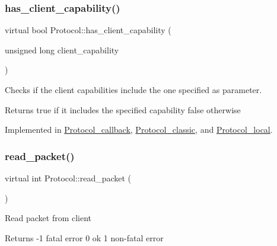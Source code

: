 \mbox{\label{classProtocol_aea1d05eaf76707b3772a00a43ea0e49b}} 
\subsubsection{\texorpdfstring{has\+\_\+client\+\_\+capability()}{has\_client\_capability()}}
{\footnotesize\ttfamily virtual bool Protocol\+::has\+\_\+client\+\_\+capability (\begin{DoxyParamCaption}\item[{unsigned long}]{client\+\_\+capability }\end{DoxyParamCaption})\hspace{0.3cm}{\ttfamily [pure virtual]}}

Checks if the client capabilities include the one specified as parameter.

\begin{DoxyReturn}{Returns}
true if it includes the specified capability false otherwise 
\end{DoxyReturn}


Implemented in \mbox{\hyperlink{classProtocol__callback_a576ec71a457f4b71c3be94b0b59e053b}{Protocol\+\_\+callback}}, \mbox{\hyperlink{classProtocol__classic_a13ece31bc9fee31fdc6668d326bbb413}{Protocol\+\_\+classic}}, and \mbox{\hyperlink{classProtocol__local_a896ec7f823e6040519d04952dc9f2fe3}{Protocol\+\_\+local}}.

\mbox{\label{classProtocol_a864cc6313ff0a75ce7a69dd7c89de4a7}} 
\subsubsection{\texorpdfstring{read\+\_\+packet()}{read\_packet()}}
{\footnotesize\ttfamily virtual int Protocol\+::read\+\_\+packet (\begin{DoxyParamCaption}{ }\end{DoxyParamCaption})\hspace{0.3cm}{\ttfamily [pure virtual]}}

Read packet from client

\begin{DoxyReturn}{Returns}
-\/1 fatal error 0 ok 1 non-\/fatal error 
\end{DoxyReturn}



